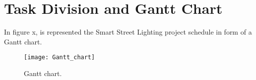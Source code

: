 \section{Task Division and Gantt Chart}

\begin{landscape}

In figure x, is represented the Smart Street Lighting project schedule in form of a Gantt chart.

\begin{figure}[ht]
	\centering
	\texttt{[image: Gantt\_chart]}
	\caption{Gantt chart.}
	\label{fig:Gantt_chart}
\end{figure}

\end{landscape}